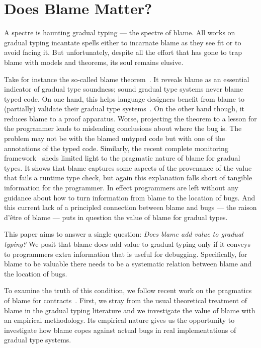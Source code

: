 \section{Does Blame Matter?}

A spectre is haunting gradual typing --- the spectre of blame.  All works
on gradual typing incantate spells either to incarnate blame as they see
fit or to avoid facing it.  But unfortunately, despite all the effort that
has gone to trap blame with models and theorems, its soul remains elusive. 

Take for instance the so-called blame theorem~\cite{mf-toplas-2009,
tf-dls-2006, wf-esop-2009}. It reveals blame as an essential indicator of
gradual type soundness; sound gradual type systems never blame typed code.
On one hand, this helps language designers benefit from blame to
(partially) validate their gradual type systems~\cite{gf-icfp-2018}. On
the other hand though, it reduces blame to a proof apparatus.  Worse,
projecting the theorem to a lesson for the programmer leads to misleading
conclusions about where the bug is. The problem  may not be with the
blamed untyped code but with one of the annotations of the typed code.
Similarly, the recent complete monitoring framework~\cite{gfd-oopsla-2019}
sheds limited light to the pragmatic nature of blame for gradual types. It
shows that blame captures some aspects of the provenance of the value that
fails a runtime type check, but again this explanation falls short of
tangible information for the programmer. In effect programmers are left
without any guidance about how to turn information from blame to the
location of bugs.  And this current lack of a principled connection
between blame and bugs ---  the raison d'\^etre of blame --- puts in
question the value of blame for gradual types.

This paper aims to answer a single question: \emph{Does blame add value to
gradual typing?} We posit that blame does add value to gradual typing only
if it conveys to programmers extra information that is useful for
debugging. Specifically, for blame to be valuable there needs to be a
systematic relation between blame and the location of bugs. 

To examine the truth of this condition, we follow recent work on the
pragmatics of blame for contracts~\cite{lksfd-popl-2020}. First, we stray
from the usual theoretical treatment of blame in the gradual typing
literature and we investigate the value of blame with an empirical
methodology. Its empirical nature gives us the opportunity to investigate how blame copes
against actual bugs in real implementations of gradual type systems.

